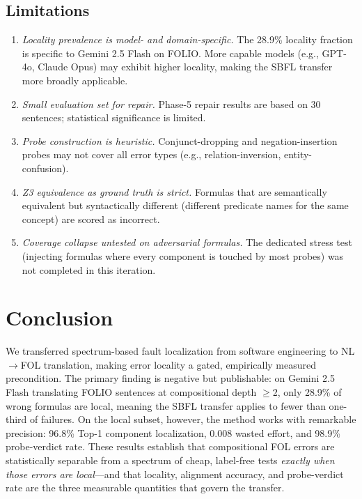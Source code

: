 \documentclass[11pt,letterpaper]{article}
\begin{document}
\subsection{Limitations}

\begin{enumerate}
  \item \emph{Locality prevalence is model- and domain-specific.} The 28.9\% locality fraction is specific to Gemini 2.5 Flash on FOLIO. More capable models (e.g., GPT-4o, Claude Opus) may exhibit higher locality, making the SBFL transfer more broadly applicable.
  \item \emph{Small evaluation set for repair.} Phase-5 repair results are based on 30 sentences; statistical significance is limited.
  \item \emph{Probe construction is heuristic.} Conjunct-dropping and negation-insertion probes may not cover all error types (e.g., relation-inversion, entity-confusion).
  \item \emph{Z3 equivalence as ground truth is strict.} Formulas that are semantically equivalent but syntactically different (different predicate names for the same concept) are scored as incorrect.
  \item \emph{Coverage collapse untested on adversarial formulas.} The dedicated stress test (injecting formulas where every component is touched by most probes) was not completed in this iteration.
\end{enumerate}

\section{Conclusion}

We transferred spectrum-based fault localization from software engineering to NL$\to$FOL translation, making error locality a gated, empirically measured precondition. The primary finding is negative but publishable: on Gemini 2.5 Flash translating FOLIO sentences at compositional depth $\geq$2, only 28.9\% of wrong formulas are local, meaning the SBFL transfer applies to fewer than one-third of failures. On the local subset, however, the method works with remarkable precision: 96.8\% Top-1 component localization, 0.008 wasted effort, and 98.9\% probe-verdict rate. These results establish that compositional FOL errors are statistically separable from a spectrum of cheap, label-free tests \emph{exactly when those errors are local}—and that locality, alignment accuracy, and probe-verdict rate are the three measurable quantities that govern the transfer.
\end{document}
